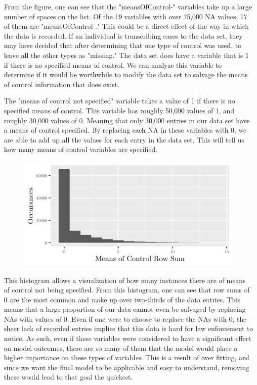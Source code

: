 \documentclass{article} %
\begin{document}
	From the figure, one can see that the "meansOfControl-" variables take up a large number of spaces on the list. Of the 19 variables with over 75,000 NA values, 17 of them are "meansOfControl-." This could be a direct effect of the way in which the data is recorded. If an individual is transcribing cases to the data set, they may have decided that after determining that one type of control was used, to leave all the other types as "missing." The data set does have a variable that is 1 if there is no specified means of control. We can analyze this variable to determine if it would be worthwhile to modify the data set to salvage the means of control information that does exist.
	
	The "means of control not specified" variable takes a value of 1 if there is no specified means of control. This variable has roughly 50,000 values of 1, and roughly 30,000 values of 0. Meaning that only 30,000 entries in our data set have a means of control specified. By replacing each NA in these variables with 0, we are able to add up all the values for each entry in the data set. This will tell us how many means of control variables are specified.
	
	\begin{figure}[H]
		\includegraphics[width = \textwidth]{MeansOfControlSumHist}
	\end{figure}
	
	This histogram allows a visualization of how many instances there are of means of control not being specified. From this histogram, one can see that row sums of 0 are the most common and make up over two-thirds of the data entries. This means that a large proportion of our data cannot even be salvaged by replacing NAs with values of 0. Even if one were to choose to replace the NAs with 0, the sheer lack of recorded entries implies that this data is hard for law enforcement to notice. As such, even if these variables were considered to have a significant effect on model outcomes, there are so many of them that the model would place a higher importance on these types of variables. This is a result of over fitting, and since we want the final model to be applicable and easy to understand, removing these would lead to that goal the quickest.
	
\end{document}
